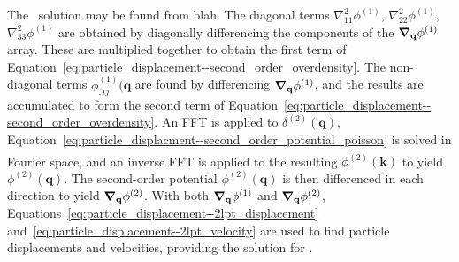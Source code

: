 The \lpt\ solution may be found from blah.  The diagonal terms $\nabla_{11}^{2} \phi^{(1)}$, $\nabla_{22}^{2} \phi^{(1)}$, $\nabla_{33}^{2} \phi^{(1)}$ are obtained by diagonally differencing the components of the ${\boldsymbol{\nabla}}_{\mathbf{q}} \phi^{(1)}$ array.  These are multiplied together to obtain the first term of Equation~\ref{eq:particle_displacement--second_order_overdensity}.  The non-diagonal terms $\phi_{,ij}^{(1)}(\mathbf{q}$ are found by differencing ${\boldsymbol{\nabla}}_{\mathbf{q}} \phi^{(1)}$, and the results are accumulated to form the second term of Equation~\ref{eq:particle_displacement--second_order_overdensity}.  An FFT is applied to $\delta^{(2)}(\mathbf{q})$, Equation~\ref{eq:particle_displacment--second_order_potential_poisson} is solved in Fourier space, and an inverse FFT is applied to the resulting $\tilde{\phi^{(2)}}(\mathbf{k})$ to yield $\phi^{(2)}(\mathbf{q})$.  The second-order potential $\phi^{(2)}(\mathbf{q})$ is then differenced in each direction to yield ${\boldsymbol{\nabla}}_{\mathbf{q}} \phi^{(2)}$.  With both ${\boldsymbol{\nabla}}_{\mathbf{q}} \phi^{(1)}$ and ${\boldsymbol{\nabla}}_{\mathbf{q}} \phi^{(2)}$, Equations~\ref{eq:particle_displacement--2lpt_displacement} and~\ref{eq:particle_displacement--2lpt_velocity} are used to find particle displacements and velocities, providing the solution for \lpt.



